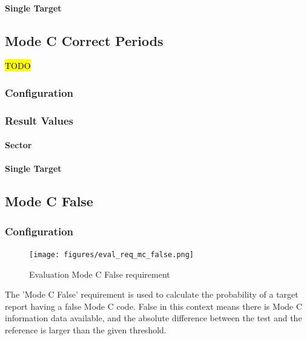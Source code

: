 \paragraph{Single Target}



\subsection{Mode C Correct Periods}
\label{sec:eval_req_mc_correct_periods} 

\hl{TODO}

\subsubsection{Configuration}

\subsubsection{Result Values}

\paragraph{Sector}
\paragraph{Single Target}



\subsection{Mode C False}
\label{sec:eval_req_mc_false} 

\subsubsection{Configuration}

\begin{figure}[H]
    \texttt{[image: figures/eval\_req\_mc\_false.png]}
  \caption{Evaluation Mode C False requirement}
\end{figure}

The 'Mode C False' requirement is used to calculate the probability of a target report having a false Mode C code. False in this context means there is Mode C information data available, and the absolute difference between the test and the reference is larger than the given threshold. \\

